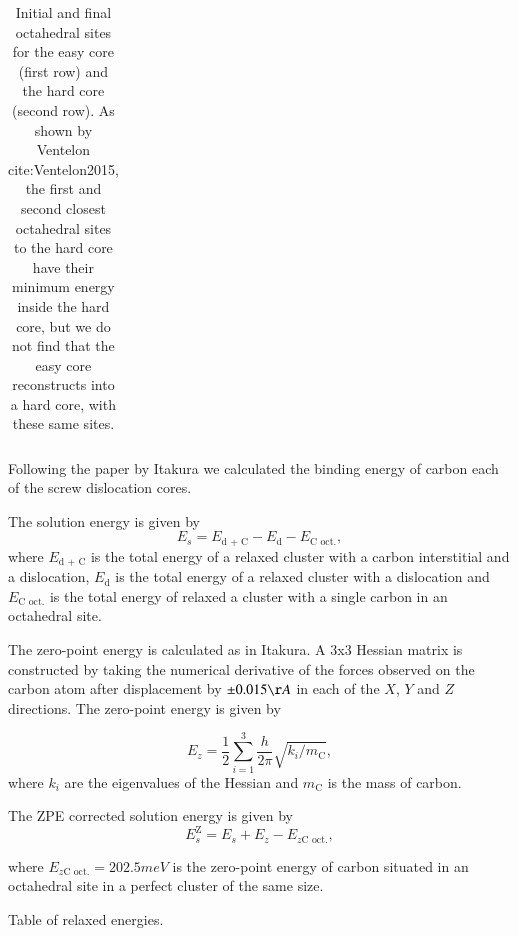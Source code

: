 \documentclass[a4paper]{apa6}
\begin{document}
\begin{table}
\begin{tabular}{cc}
    	      \end{tabular}		
\caption{ Initial and final octahedral sites for the easy core (first row) and the hard core (second row). As shown by Ventelon cite:Ventelon2015, the first and second closest octahedral sites to the hard core have their minimum energy inside the hard core, but we do not find that the easy core reconstructs into a hard core, with these same sites. }
    \end{table}


Following the paper by Itakura
\cite{itakura13_effec_hydrog_atoms_screw_disloc} we calculated the
binding energy of carbon each of the screw dislocation cores. 

The solution energy is given by 
\[ E_s = E_{\text{d + C}} - E_{\text{d}} - E_{\text{C oct.}}, \]
where \(E_{\text{d + C}}\) is the total energy of a relaxed cluster with a
carbon interstitial and a dislocation, \(E_{\text{d}}\) is the total
energy of a relaxed cluster with a dislocation and \(E_{\text{C
    oct.}}\) is the total energy of relaxed a cluster with a single carbon in
an octahedral site.

The zero-point energy is calculated as in Itakura. A 3x3 Hessian
matrix is constructed by taking the numerical derivative of the
forces observed on the carbon atom after displacement by \(\pm 0.015 \AA\) in each of the \(X\), \(Y\) and \(Z\)
directions. The zero-point energy is given by

\[ E_z = \frac{1}{2} \sum_{i=1}^3 \frac{h}{2\pi} \sqrt{ k_i /
    m_{\text{C}} },  \]
where \(k_i\) are the eigenvalues of the Hessian and \(m_\text{C}\) is
the mass of carbon. 

The ZPE corrected solution energy is given by 
\[ E^{\text{Z}}_{s} = E_s + E_z - E_{z\text{C oct.}},  \]

where \(E_{z\text{C oct.}} = 202.5 meV\) is the zero-point energy of carbon
situated in an octahedral site in a perfect cluster of the same size. 

Table of relaxed energies.  
\end{document}
